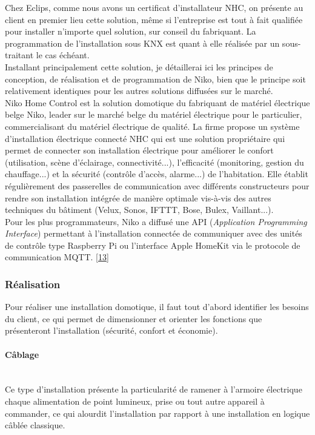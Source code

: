 \documentclass[a4paper, 12pt]{article}
\begin{document}
Chez Eclips, comme nous avons un certificat d'installateur NHC, on présente au client en premier lieu 
cette  solution, même si l'entreprise est tout à fait qualifiée pour installer n'importe quel solution, sur conseil du fabriquant. La programmation de l'installation sous KNX est quant à elle réalisée par un sous-traitant le cas échéant.\\Installant principalement cette solution, je détaillerai ici les principes de conception, de réalisation et de programmation de Niko, bien que le principe soit relativement identiques pour les autres solutions diffusées sur le marché.\\

Niko Home Control est la solution domotique du fabriquant de matériel électrique belge Niko, leader sur le marché belge du matériel électrique pour le particulier, commercialisant du matériel électrique de qualité. La firme propose un système d'installation électrique connecté NHC qui est une solution propriétaire qui permet de connecter son installation électrique pour améliorer le confort (utilisation, scène d'éclairage, connectivité...), l'efficacité (monitoring, gestion du chauffage...) et la sécurité (contrôle d'accès, alarme...) de l'habitation. Elle établit régulièrement des passerelles de communication avec différents constructeurs pour rendre son installation intégrée de manière optimale vis-à-vis des autres techniques du bâtiment (Velux, Sonos, IFTTT, Bose, Bulex, Vaillant...).\\Pour les plus programmateurs, Niko a diffusé une API (\textit{Application Programming Interface}) permettant à l'installation connectée de communiquer avec des unités de contrôle type Raspberry Pi ou l'interface Apple HomeKit via le protocole de communication MQTT. \href{https://www.niko.eu/fr-be/nos-produits/automatisation-domestique}{[13]}

\subsubsection{Réalisation}

Pour réaliser une installation domotique, il faut tout d'abord identifier les besoins du client, ce qui permet de dimensionner et orienter les fonctions que présenteront l'installation (sécurité, confort et économie).

\paragraph{Câblage}
~\\
Ce type d’installation présente la particularité de ramener à l’armoire électrique chaque alimentation de point lumineux, prise ou tout autre appareil à commander, ce qui alourdit l'installation par rapport à une installation en logique câblée classique.\\
\end{document}
